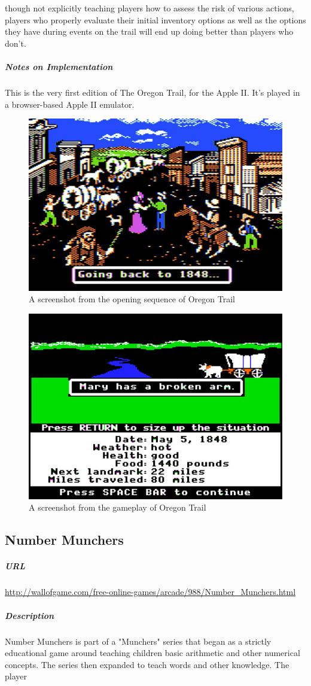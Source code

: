 though not explicitly teaching players how to assess the risk of various actions, players who properly evaluate their initial inventory options as well as the options they have during events on the trail will end up doing better than players who don't.\subparagraph{Notes on Implementation}This is the very first edition of The Oregon Trail, for the Apple II. It's played in a browser-based Apple II emulator.\begin{figure}[p]\centering \includegraphics[height=.4\textheight, width=\textwidth, keepaspectratio=true]{img/oregon_title.jpg}\caption{A screenshot from the opening sequence of Oregon Trail}\end{figure}\begin{figure}[p]\centering \includegraphics[height=.4\textheight, width=\textwidth, keepaspectratio=true]{img/oregon_screen.jpg}\caption{A screenshot from the gameplay of Oregon Trail}\end{figure}\subsection{Number Munchers}\subparagraph{URL}\url{http://wallofgame.com/free-online-games/arcade/988/Number_Munchers.html}\subparagraph{Description}Number Munchers is part of a "Munchers" series that began as a strictly educational game around teaching children basic arithmetic and other numerical concepts. The series then expanded to teach words and other knowledge. The player 